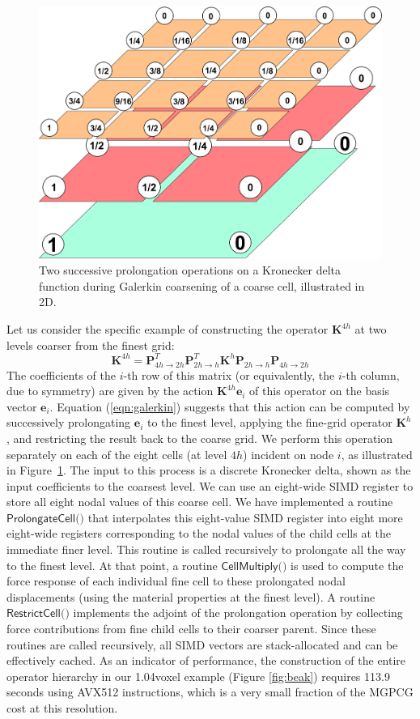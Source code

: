 \begin{figure}
\includegraphics[width=.3\textwidth]{images/TopOpt/prolongation_v2}
\caption{Two successive prolongation operations on a Kronecker delta function during Galerkin coarsening of a coarse cell, illustrated in 2D.}
\label{fig:prolongation}
\end{figure}

Let us consider the specific example of constructing the operator $\mathbf{K}^{4h}$ at two levels coarser from the finest grid:
\begin{equation}
\mathbf{K}^{4h}=\mathbf{P}_{4h\rightarrow 2h}^{T}\mathbf{P}_{2h\rightarrow h}^{T}\mathbf{K}^h\mathbf{P}_{2h\rightarrow h}\mathbf{P}_{4h\rightarrow 2h}
\label{eqn:galerkin}
\end{equation}
The coefficients of the $i$-th row of this matrix (or equivalently, the $i$-th column, due to symmetry) are given by the action $\mathbf{K}^{4h}\mathbf{e}_i$ of this operator on the
basis vector $\mathbf{e}_i$. Equation (\ref{eqn:galerkin}) suggests that this action can be computed by successively prolongating $\mathbf{e}_i$ to the finest level, applying the
fine-grid operator $\mathbf{K}^{h}$, and restricting the result back to the coarse grid. 
We perform this operation separately on each of the eight cells (at level $4h$) incident on node $i$,
as illustrated in Figure~\ref{fig:prolongation}. The input to this process is a discrete Kronecker delta, shown as the input coefficients to the coarsest level. 
We can use an eight-wide SIMD register to store all eight nodal values of this
coarse cell. We have implemented a routine $\textsf{ProlongateCell()}$ that interpolates this eight-value SIMD register into eight more eight-wide registers corresponding to the nodal values of
the child cells at the immediate finer level. This routine is called recursively to prolongate all the way to the finest level. At that point, a routine $\textsf{CellMultiply()}$ is used
to compute the force response of each individual fine cell to these prolongated nodal displacements (using the material properties at the finest level). 
A routine $\textsf{RestrictCell()}$ implements the adjoint of the prolongation operation by collecting force contributions from fine child cells to their coarser parent. Since these routines are
called recursively, all SIMD vectors are stack-allocated and can be effectively cached.
As an indicator of performance, the construction of the entire operator hierarchy in our 1.04voxel example (Figure \ref{fig:beak}) requires 113.9 seconds using AVX512 instructions, which is a very small fraction of the MGPCG cost at this resolution.



